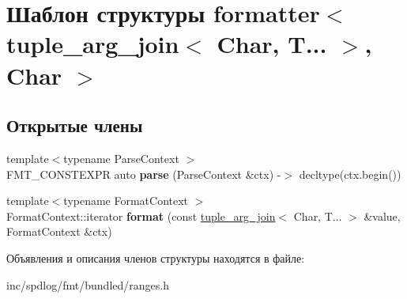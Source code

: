 \hypertarget{structformatter_3_01tuple__arg__join_3_01Char_00_01T_8_8_8_01_4_00_01Char_01_4}{}\section{Шаблон структуры formatter$<$ tuple\+\_\+arg\+\_\+join$<$ Char, T... $>$, Char $>$}
\label{structformatter_3_01tuple__arg__join_3_01Char_00_01T_8_8_8_01_4_00_01Char_01_4}
\subsection*{Открытые члены}
\begin{DoxyCompactItemize}
\item 
\mbox{\label{structformatter_3_01tuple__arg__join_3_01Char_00_01T_8_8_8_01_4_00_01Char_01_4_a4ac4d8d2189a043b7379f3e40e419dfc}} 
{\footnotesize template$<$typename Parse\+Context $>$ }\\F\+M\+T\+\_\+\+C\+O\+N\+S\+T\+E\+X\+PR auto {\bfseries parse} (Parse\+Context \&ctx) -\/$>$ decltype(ctx.\+begin())
\item 
\mbox{\label{structformatter_3_01tuple__arg__join_3_01Char_00_01T_8_8_8_01_4_00_01Char_01_4_aaeaca45d7fe6ca2ce4187cd18c00f651}} 
{\footnotesize template$<$typename Format\+Context $>$ }\\Format\+Context\+::iterator {\bfseries format} (const \hyperlink{structtuple__arg__join}{tuple\+\_\+arg\+\_\+join}$<$ Char, T... $>$ \&value, Format\+Context \&ctx)
\end{DoxyCompactItemize}


Объявления и описания членов структуры находятся в файле\+:\begin{DoxyCompactItemize}
\item 
inc/spdlog/fmt/bundled/ranges.\+h\end{DoxyCompactItemize}

